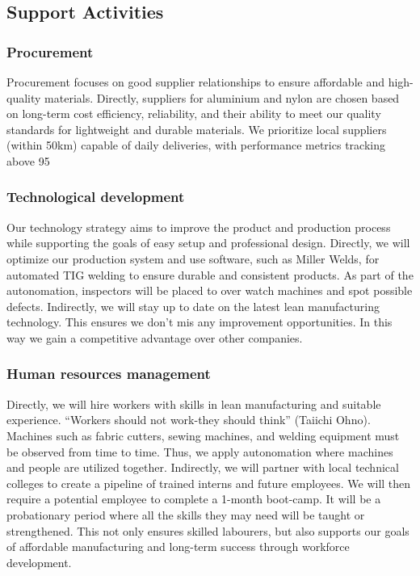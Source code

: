 \documentclass{article}
\begin{document}
  \subsection{Support Activities}
  \subsubsection{Procurement}
  Procurement focuses on good supplier relationships to ensure affordable and high-quality materials. Directly, suppliers for aluminium and nylon are chosen based on long-term cost efficiency, reliability, and their ability to meet our quality standards for lightweight and durable materials. We prioritize local suppliers (within 50km) capable of daily deliveries, with performance metrics tracking above 95%
  \subsubsection{Technological development}
  Our technology strategy aims to improve the product and production process while supporting the goals of easy setup and professional design. Directly, we will optimize our production system and use software, such as Miller Welds, for automated TIG welding to ensure durable and consistent products. As part of the autonomation, inspectors will be placed to over watch machines and spot possible defects. Indirectly, we will stay up to date on the latest lean manufacturing technology. This ensures we don’t mis any improvement opportunities. In this way we gain a competitive advantage over other companies.
  \subsubsection{Human resources management}
   Directly, we will hire workers with skills in lean manufacturing and suitable experience. “Workers should not work-they should think” (Taiichi Ohno). Machines such as fabric cutters, sewing machines, and welding equipment must be observed from time to time. Thus, we apply autonomation where machines and people are utilized together. Indirectly, we will partner with local technical colleges to create a pipeline of trained interns and future employees. We will then require a potential employee to complete a 1-month boot-camp. It will be a probationary period where all the skills they may need will be taught or strengthened. This not only ensures skilled labourers, but also supports our goals of affordable manufacturing and long-term success through workforce development.
\end{document}
